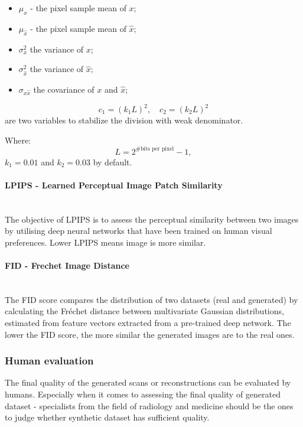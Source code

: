 \begin{itemize}
    \item $\mu_{x}$ - the pixel sample mean of $x$;  
    \item $\mu_{\hat{x}}$ - the pixel sample mean of $\hat{x}$;  
    \item $\sigma_{x}^{2}$ the variance of $x$;  
    \item $\sigma_{\hat{x}}^{2}$ the variance of $\hat{x}$;  
    \item $\sigma_{x\hat{x}}$ the covariance of $x$ and $\hat{x}$;  
\end{itemize}

\begin{equation}
c_{1} = (k_{1}L)^{2}, \quad c_{2} = (k_{2}L)^{2}
\end{equation}
are two variables to stabilize the division with weak denominator.

Where:
\begin{equation}
L = 2^{\#\text{bits per pixel}} - 1,
\end{equation}
$k_{1} = 0.01$ and $k_{2} = 0.03$ by default.

\paragraph{LPIPS - Learned Perceptual Image Patch Similarity}\mbox{}\\
\indent The objective of LPIPS is to assess the perceptual similarity between two images by utilising deep neural networks that have been trained on human visual preferences. Lower LPIPS means image is more similar.

\paragraph{FID - Frechet Image Distance}\mbox{}\\
\indent The FID score compares the distribution of two datasets (real and generated) by calculating the Fréchet distance between multivariate Gaussian distributions, estimated from feature vectors extracted from a pre-trained deep network. The lower the FID score, the more similar the generated images are to the real ones. 

\subsubsection{Human evaluation}
The final quality of the generated scans or reconstructions can be evaluated by humans. Especially when it comes to assessing the final quality of generated dataset - specialists from the field of radiology and medicine should be the ones to judge whether synthetic dataset has sufficient quality. 
